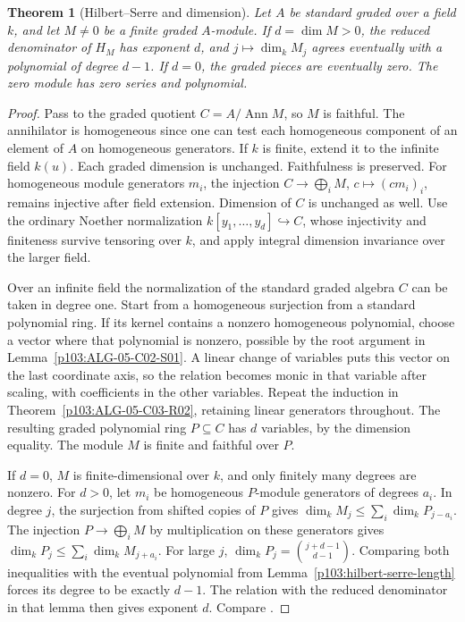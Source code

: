 \documentclass[11pt,oneside,openany]{book}
\newtheorem{theorem}{Theorem}[chapter]
\theoremstyle{definition}
\theoremstyle{remark}
\begin{document}
\begin{theorem}[Hilbert--Serre and dimension]\label{p103:ALG-05-C03-R04}
Let \(A\) be standard graded over a field \(k\), and let \(M\ne0\) be a finite graded \(A\)-module. If \(d=\dim M>0\), the reduced denominator of \(H_M\) has exponent \(d\), and \(j\mapsto\dim_k M_j\) agrees eventually with a polynomial of degree \(d-1\). If \(d=0\), the graded pieces are eventually zero. The zero module has zero series and polynomial.
\end{theorem}
\begin{proof}
Pass to the graded quotient \(C=A/\operatorname{Ann}M\), so \(M\) is faithful. The annihilator is homogeneous since one can test each homogeneous component of an element of \(A\) on homogeneous generators. If \(k\) is finite, extend it to the infinite field \(k(u)\). Each graded dimension is unchanged. Faithfulness is preserved. For homogeneous module generators \(m_i\), the injection \(C\to\bigoplus_i M\), \(c\mapsto(cm_i)_i\), remains injective after field extension. Dimension of \(C\) is unchanged as well. Use the ordinary Noether normalization \(k[y_1,\ldots,y_d]\hookrightarrow C\), whose injectivity and finiteness survive tensoring over \(k\), and apply integral dimension invariance over the larger field.

Over an infinite field the normalization of the standard graded algebra \(C\) can be taken in degree one. Start from a homogeneous surjection from a standard polynomial ring. If its kernel contains a nonzero homogeneous polynomial, choose a vector where that polynomial is nonzero, possible by the root argument in Lemma~\ref{p103:ALG-05-C02-S01}. A linear change of variables puts this vector on the last coordinate axis, so the relation becomes monic in that variable after scaling, with coefficients in the other variables. Repeat the induction in Theorem~\ref{p103:ALG-05-C03-R02}, retaining linear generators throughout. The resulting graded polynomial ring \(P\subseteq C\) has \(d\) variables, by the dimension equality. The module \(M\) is finite and faithful over \(P\).

If \(d=0\), \(M\) is finite-dimensional over \(k\), and only finitely many degrees are nonzero. For \(d>0\), let \(m_i\) be homogeneous \(P\)-module generators of degrees \(a_i\). In degree \(j\), the surjection from shifted copies of \(P\) gives
\(\dim_k M_j\le\sum_i\dim_k P_{j-a_i}\).
The injection \(P\to\bigoplus_i M\) by multiplication on these generators gives
\(\dim_k P_j\le\sum_i\dim_k M_{j+a_i}\).
For large \(j\), \(\dim_k P_j=\binom{j+d-1}{d-1}\). Comparing both inequalities with the eventual polynomial from Lemma~\ref{p103:hilbert-serre-length} forces its degree to be exactly \(d-1\). The relation with the reduced denominator in that lemma then gives exponent \(d\). Compare \cite[Section 1.9 and the graded dimension discussion in Section 13.4]{eisenbud}.
\end{proof}
\end{document}

